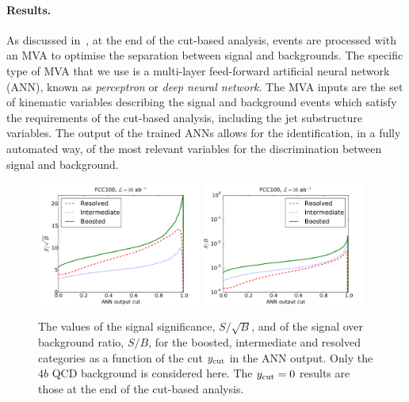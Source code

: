 \documentclass[a4paper,10pt]{article}
\begin{document}
\paragraph{Results.}
As discussed in~\cite{Behr:2015oqq}, at the end of the cut-based
analysis, events are processed with an MVA to optimise
the separation between signal and backgrounds.
%
The specific type of  MVA that we use is
a multi-layer feed-forward artificial neural network (ANN),
known as {\it perceptron} or {\it deep neural network}.
%
The MVA inputs are the set of kinematic variables describing the
signal and background
events which satisfy the requirements of the
cut-based analysis, including the jet substructure variables.
%
The output of the trained ANNs allows for the identification,
in a fully automated way,
of the most relevant variables for the discrimination between 
signal and background.


\begin{figure}[t]
\begin{center}
\includegraphics[width=0.48\textwidth]{plots/ssb_FCC100_4b.pdf}
\includegraphics[width=0.48\textwidth]{plots/sb_FCC100_4b.pdf}
\caption{\small
  The values of the signal significance, $S/\sqrt{B}$, and of the
  signal over background ratio, $S/B$, for the boosted, intermediate
  and resolved categories as a function of the cut
  $y_{\rm cut}$ in the ANN output.
  Only the $4b$ QCD background is considered here.
  The $y_{\rm cut}=0$
  results are those at the end of the cut-based
  analysis. 
}
\label{fig:sb_mva}
\end{center}
\end{figure}
\end{document}
